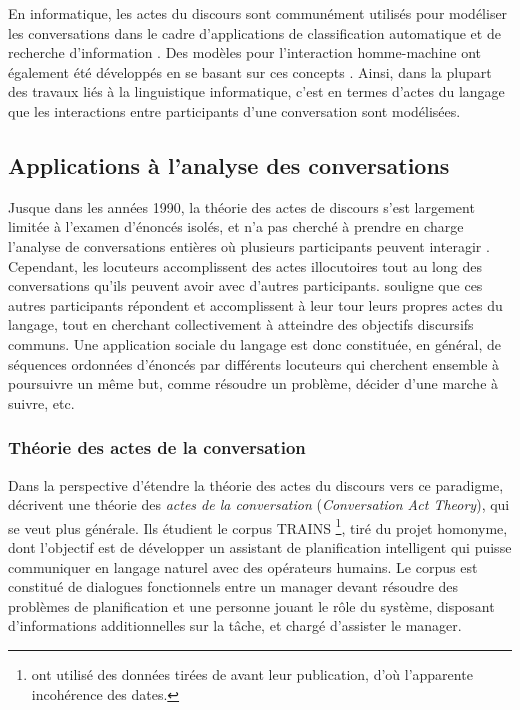 \documentclass[10pt,a4paper,twoside]{article}
\begin{document}
En informatique, les actes du discours sont communément utilisés pour modéliser les conversations dans le cadre d'applications de classification automatique et de recherche d'information \cite{twitchell2004using}. Des modèles pour l'interaction homme-machine ont également été développés en se basant sur ces concepts \cite{morelli1991computational}. Ainsi, dans la plupart des travaux liés à la linguistique informatique, c’est en termes d’actes du langage que les interactions entre participants d’une conversation sont modélisées.

\subsection{Applications à l'analyse des conversations}
\label{subsec:applications_in_conversation_analysis}

Jusque dans les années 1990, la théorie des actes de discours s'est largement limitée à l'examen d'énoncés isolés, et n'a pas cherché à prendre en charge l'analyse de conversations entières où plusieurs participants peuvent interagir \cite{vanderveken1994theorie}. Cependant, les locuteurs accomplissent des actes illocutoires tout au long des conversations qu'ils peuvent avoir avec d'autres participants. \citeauthor{vanderveken1994theorie} souligne que ces autres participants répondent et accomplissent à leur tour leurs propres actes du langage, tout en cherchant collectivement à atteindre des objectifs discursifs communs. Une application sociale du langage est donc constituée, en général, de séquences ordonnées d'énoncés par différents locuteurs qui cherchent ensemble à poursuivre un même but, comme résoudre un problème, décider d'une marche à suivre, etc.

\subsubsection{Théorie des actes de la conversation}

Dans la perspective d'étendre la théorie des actes du discours vers ce paradigme, \citet{traum1992conversation} décrivent une théorie des \textit{actes de la conversation} (\textit{Conversation Act Theory}), qui se veut plus générale. Ils étudient le corpus TRAINS \cite{gross1993trains}\footnote{\citeauthor{traum1992conversation} ont utilisé des données tirées de \cite{gross1993trains} avant leur publication, d'où l'apparente incohérence des dates.}, tiré du projet homonyme, dont l'objectif est de développer un assistant de planification intelligent qui puisse communiquer en langage naturel avec des opérateurs humains. Le corpus est constitué de dialogues fonctionnels entre un manager devant résoudre des problèmes de planification et une personne jouant le rôle du système, disposant d'informations additionnelles sur la tâche, et chargé d'assister le manager. 
\end{document}
